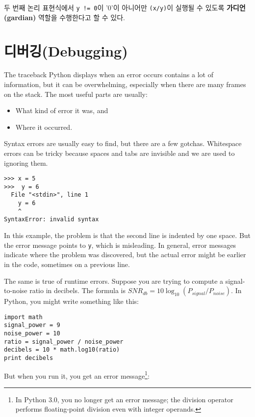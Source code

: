 두 번째 논리 표현식에서 {\tt y != 0}이 '0'이 아니어만 {\tt (x/y)}이 실행될 수 있도록 {\bf 가디언(gardian)} 역할을 수행한다고 할 수 있다.

\section{디버깅(Debugging)}

The traceback Python displays when an error occurs contains
a lot of information, but it can be overwhelming, especially
when there are many frames on the stack.  The most
useful parts are usually:

\begin{itemize}

\item What kind of error it was, and

\item Where it occurred.

\end{itemize}

Syntax errors are usually easy to find, but there are a few
gotchas.  Whitespace errors can be tricky because spaces and
tabs are invisible and we are used to ignoring them.


\beforeverb
\begin{verbatim}
>>> x = 5
>>>  y = 6
  File "<stdin>", line 1
    y = 6
    ^
SyntaxError: invalid syntax
\end{verbatim}
\afterverb
%
In this example, the problem is that the second line is indented by
one space.  But the error message points to {\tt y}, which is
misleading.  In general, error messages indicate where the problem was
discovered, but the actual error might be earlier in the code,
sometimes on a previous line.


The same is true of runtime errors.  Suppose you are trying
to compute a signal-to-noise ratio in decibels.  The formula
is $SNR_{db} = 10 \log_{10} (P_{signal} / P_{noise})$.  In Python,
you might write something like this:

\beforeverb
\begin{verbatim}
import math
signal_power = 9
noise_power = 10
ratio = signal_power / noise_power
decibels = 10 * math.log10(ratio)
print decibels
\end{verbatim}
\afterverb
%
But when you run it, you get an error message\footnote{In Python 3.0,
  you no longer get an error message; the division operator performs
  floating-point division even with integer operands.}:


